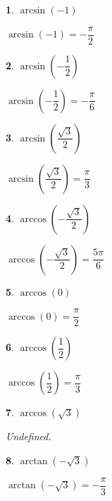 \documentclass{amsbook}
\newtheorem{exc}{}
\newenvironment{ex}{\begin{exc}\normalfont}{\end{exc}}
\numberwithin{section}{chapter}
\numberwithin{equation}{chapter}
\begin{document}
 \begin{multicols}{2}
 
\begin{ex}
		$\arcsin \left( -1 \right) $
	\begin{sol}
		$\arcsin \left( -1 \right) = -\dfrac{\pi}{2}$ 
	\end{sol}
\end{ex}

\begin{ex}
		$\arcsin \left( -\dfrac{1}{2} \right)$
	\begin{sol}
		$\arcsin \left( -\dfrac{1}{2} \right) = -\dfrac{\pi}{6}$
	\end{sol}
\end{ex}

 
\begin{ex}
	 $\arcsin \left( \dfrac{\sqrt{3}}{2} \right)$
	\begin{sol}
		 $\arcsin \left( \dfrac{\sqrt{3}}{2} \right) = \dfrac{\pi}{3}$
	\end{sol}
\end{ex}

\begin{ex}
		$\arccos \left( -\dfrac{\sqrt{3}}{2} \right)$
	\begin{sol}
		$\arccos \left( -\dfrac{\sqrt{3}}{2} \right) = \dfrac{5\pi}{6}$
	\end{sol}
\end{ex}

 
\begin{ex}
	 $\arccos \left( 0 \right)$
	\begin{sol}
		 $\arccos \left( 0 \right) = \dfrac{\pi}{2}$
	\end{sol}
\end{ex}

\begin{ex}
		 $\arccos \left( \dfrac{1}{2} \right)$
	\begin{sol}
		 $\arccos \left( \dfrac{1}{2} \right) = \dfrac{\pi}{3}$
	\end{sol}
\end{ex}

 
\begin{ex}
			 $\arccos \left(\sqrt{3}\right)$
	\begin{sol}
		Undefined.
	\end{sol}
\end{ex}

\begin{ex}
	$\arctan \left( -\sqrt{3} \right) $
	\begin{sol}
		$\arctan \left( -\sqrt{3} \right) = -\dfrac{\pi}{3}$
	\end{sol}
\end{ex}


\end{multicols}
\end{document}
